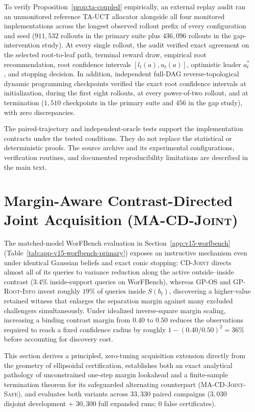 \documentclass{article}
\theoremstyle{plain}
\theoremstyle{definition}
\begin{document}
To verify Proposition~\ref{prop:ta-coupled} empirically, an external replay audit ran an unmonitored reference TA-UCT allocator alongside all four monitored implementations across the longest observed rollout prefix of every configuration and seed ($911{,}532$ rollouts in the primary suite plus $436{,}096$ rollouts in the gap-intervention study). At every single rollout, the audit verified exact agreement on the selected root-to-leaf path, terminal reward draw, empirical root recommendation, root confidence intervals $[l_t(a), u_t(a)]$, optimistic leader $a_t^*$, and stopping decision. In addition, independent full-DAG reverse-topological dynamic programming checkpoints verified the exact root confidence intervals at initialization, during the first eight rollouts, at every power-of-two rollout, and at termination ($1{,}510$ checkpoints in the primary suite and $456$ in the gap study), with zero discrepancies.

The paired-trajectory and independent-oracle tests support the implementation contracts under the tested conditions. They do not replace the statistical or deterministic proofs. The source archive and its experimental configurations, verification routines, and documented reproducibility limitations are described in the main text.

\clearpage
\section{Margin-Aware Contrast-Directed Joint Acquisition (\textsc{MA-CD-Joint})}
\label{app:margin-aware}

The matched-model WorFBench evaluation in Section~\ref{app:v15-worfbench} (Table~\ref{tab:app-v15-worfbench-primary}) exposes an instructive mechanism even under identical Gaussian beliefs and exact conic stopping: \textsc{CD-Joint} directs almost all of its queries to variance reduction along the active outside--inside contrast ($3.4\%$ inside-support queries on WorFBench), whereas \textsc{GP-OS} and \textsc{GP-Root-Info} invest roughly $19\%$ of queries inside $S(b_t)$, discovering a higher-value retained witness that enlarges the separation margin against many excluded challengers simultaneously. Under idealized inverse-square margin scaling, increasing a binding contrast margin from $0.40$ to $0.50$ reduces the observations required to reach a fixed confidence radius by roughly $1-(0.40/0.50)^2 = 36\%$ before accounting for discovery cost.

This section derives a principled, zero-tuning acquisition extension directly from the geometry of ellipsoidal certification, establishes both an exact analytical pathology of unconstrained one-step margin lookahead and a finite-sample termination theorem for its safeguarded alternating counterpart (\textsc{MA-CD-Joint-Safe}), and evaluates both variants across $33{,}330$ paired campaigns ($3{,}030$ disjoint development + $30{,}300$ full expanded runs; $0$ false certificates).
\end{document}
